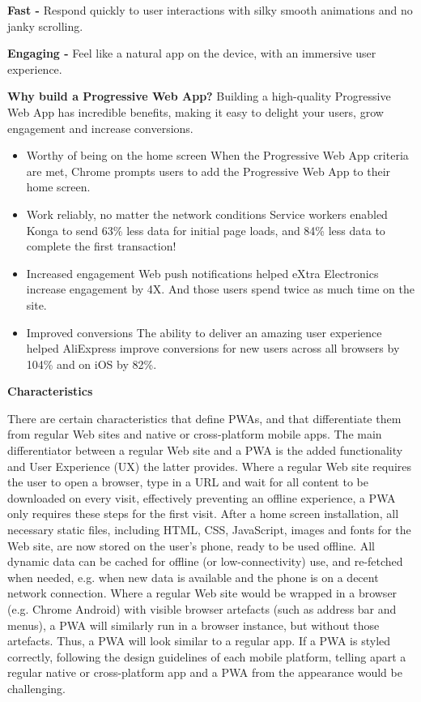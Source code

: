 \documentclass[14pt,a4paper,final]{extreport}
\begin{document}
\item \textbf{Fast -} Respond quickly to user interactions with silky smooth animations and no janky scrolling.
\item \textbf{Engaging -} Feel like a natural app on the device, with an immersive user experience.
\item \textbf{Why build a Progressive Web App?}
\newline Building a high-quality Progressive Web App has incredible benefits, making it easy to delight your users, grow engagement and increase conversions.
\begin{itemize}
\item Worthy of being on the home screen
When the Progressive Web App criteria are met, Chrome prompts users to add the Progressive Web App to their home screen.
\item Work reliably, no matter the network conditions
Service workers enabled Konga to send 63\% less data for initial page loads, and 84\% less data to complete the first transaction!
\item Increased engagement
Web push notifications helped eXtra Electronics increase engagement by 4X. And those users spend twice as much time on the site.
\item Improved conversions
The ability to deliver an amazing user experience helped AliExpress improve conversions for new users across all browsers by 104\% and on iOS by 82\%.
\end{itemize}
\textbf{Characteristics}

There are certain characteristics that define PWAs, and that differentiate them from regular Web sites and native or cross-platform mobile apps. The main differentiator between a regular Web site and a PWA is the added functionality and User Experience (UX) the latter provides. Where a regular Web site requires the user to open a browser, type in a URL and wait for all content to be downloaded on every visit, effectively preventing an offline experience, a PWA only requires these steps for the first visit. After a home screen installation, all necessary static files, including HTML, CSS, JavaScript, images and fonts for the Web site, are now stored on the user’s phone, ready to be used offline. All dynamic data can be cached for offline (or low-connectivity) use, and re-fetched when needed, e.g. when new data is available and the phone is on a decent network connection.
Where a regular Web site would be wrapped in a browser (e.g. Chrome Android) with visible browser artefacts (such as address bar and menus), a PWA will similarly run in a browser instance, but without those artefacts. Thus, a PWA will look similar to a regular app. If a PWA is styled correctly, following the design guidelines of each mobile platform, telling apart a regular native or cross-platform app and a PWA from the appearance would be challenging.
\end{document}
